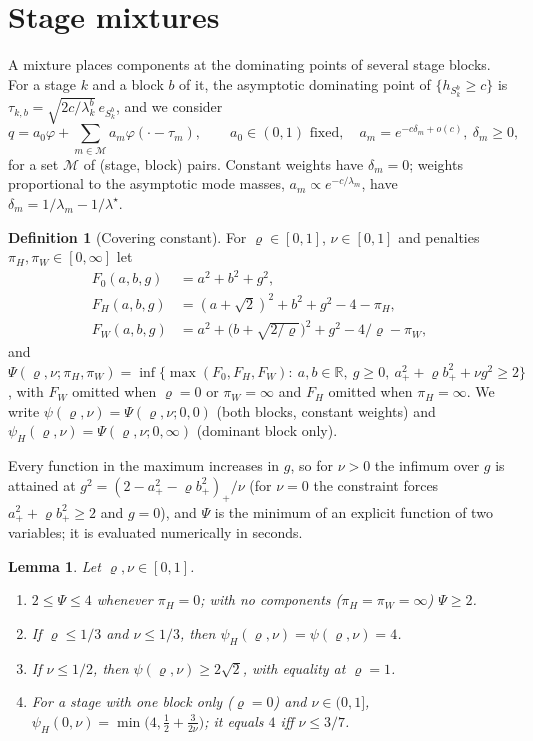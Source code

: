\documentclass[11pt]{article}
\newtheorem{lemma}{Lemma}
\theoremstyle{definition}
\newtheorem{definition}{Definition}
\theoremstyle{remark}
\newcommand{\R}{\mathbb{R}}
\begin{document}
\section{Stage mixtures}
\label{sec:mixture}

A mixture places components at the dominating points of several stage blocks. For a
stage $k$ and a block $b$ of it, the asymptotic dominating point of $\{h_{S^b_k}\ge c\}$
is $\tau_{k,b}=\sqrt{2c/\lambda^b_k}\,e_{S^b_k}$, and we consider
\[
q=a_0\varphi+\sum_{m\in\mathcal M}a_m\varphi(\cdot-\tau_m),\qquad
a_0\in(0,1)\text{ fixed},\quad a_m=e^{-c\delta_m+o(c)},\ \delta_m\ge0,
\]
for a set $\mathcal M$ of (stage, block) pairs. Constant weights have $\delta_m=0$; weights
proportional to the asymptotic mode masses, $a_m\propto e^{-c/\lambda_m}$, have
$\delta_m=1/\lambda_m-1/\lambda^\star$.

\begin{definition}[Covering constant]\label{def:psi}
For $\varrho\in[0,1]$, $\nu\in[0,1]$ and penalties $\pi_H,\pi_W\in[0,\infty]$ let
\begin{align*}
F_0(a,b,g)&=a^2+b^2+g^2,\\
F_H(a,b,g)&=(a+\sqrt2)^2+b^2+g^2-4-\pi_H,\\
F_W(a,b,g)&=a^2+\big(b+\sqrt{2/\varrho}\big)^2+g^2-4/\varrho-\pi_W,
\end{align*}
and
$\Psi(\varrho,\nu;\pi_H,\pi_W)=\inf\{\max(F_0,F_H,F_W):\ a,b\in\R,\ g\ge0,\
a_+^2+\varrho b_+^2+\nu g^2\ge2\}$,
with $F_W$ omitted when $\varrho=0$ or $\pi_W=\infty$ and $F_H$ omitted when
$\pi_H=\infty$. We write $\psi(\varrho,\nu)=\Psi(\varrho,\nu;0,0)$ (both blocks, constant
weights) and $\psi_H(\varrho,\nu)=\Psi(\varrho,\nu;0,\infty)$ (dominant block only).
\end{definition}

Every function in the maximum increases in $g$, so for $\nu>0$ the infimum over $g$ is
attained at $g^2=(2-a_+^2-\varrho b_+^2)_+/\nu$ (for $\nu=0$ the constraint forces
$a_+^2+\varrho b_+^2\ge2$ and $g=0$), and $\Psi$ is the minimum of an explicit function of
two variables; it is evaluated numerically in seconds.

\begin{lemma}\label{lem:psi}
Let $\varrho,\nu\in[0,1]$.
\begin{enumerate}
\item[(a)] $2\le\Psi\le4$ whenever $\pi_H=0$; with no components ($\pi_H=\pi_W=\infty$)
$\Psi\ge2$.
\item[(b)] If $\varrho\le1/3$ and $\nu\le1/3$, then $\psi_H(\varrho,\nu)=\psi(\varrho,\nu)=4$.
\item[(c)] If $\nu\le1/2$, then $\psi(\varrho,\nu)\ge2\sqrt2$, with equality at $\varrho=1$.
\item[(d)] For a stage with one block only ($\varrho=0$) and $\nu\in(0,1]$,
$\psi_H(0,\nu)=\min\big(4,\tfrac12+\tfrac3{2\nu}\big)$; it equals $4$ iff $\nu\le3/7$.
\end{enumerate}
\end{lemma}
\end{document}
